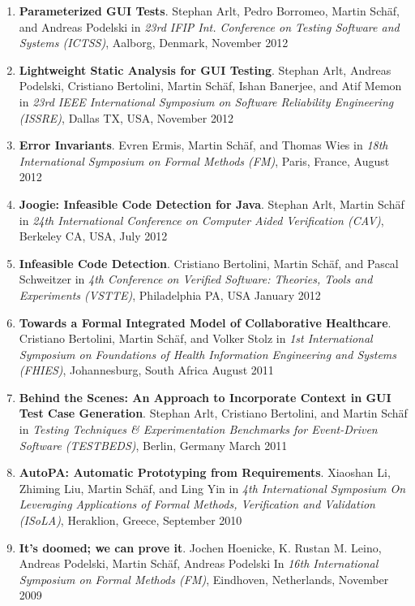 \begin{enumerate}
\item \textbf{Parameterized GUI Tests}. Stephan
Arlt, Pedro Borromeo,  Martin Sch\"af, and Andreas Podelski  in \emph{ 23rd
IFIP Int. Conference on Testing Software and Systems (ICTSS)}, Aalborg, Denmark,
November 2012

  
\item \textbf{Lightweight Static Analysis for GUI Testing}. Stephan
Arlt, Andreas Podelski, Cristiano Bertolini, Martin Sch\"af, Ishan Banerjee, and
Atif Memon in \emph{ 23rd IEEE International Symposium on Software Reliability
Engineering (ISSRE)}, Dallas TX, USA, November 2012


\item \textbf{Error Invariants}. Evren Ermis, Martin Sch\"af, and Thomas Wies in
\emph{18th International Symposium on Formal Methods (FM)}, Paris, France,
August 2012

\item \textbf{Joogie: Infeasible Code Detection for Java}. Stephan Arlt, Martin
Sch\"af in \emph{24th International Conference on Computer Aided Verification
(CAV)}, Berkeley CA, USA, July 2012

\item \textbf{Infeasible Code Detection}. Cristiano Bertolini, Martin
Sch\"af, and Pascal Schweitzer in \emph{4th Conference on Verified Software:
Theories, Tools and Experiments (VSTTE)}, Philadelphia PA, USA January 2012

\item \textbf{Towards a Formal Integrated Model of Collaborative Healthcare}.
Cristiano Bertolini, Martin Sch\"af, and Volker Stolz  in \emph{1st International Symposium on 
Foundations of Health Information Engineering and Systems (FHIES)}, Johannesburg, South Africa
August 2011

\item \textbf{Behind the Scenes: An Approach to Incorporate Context in GUI Test
Case Generation}. Stephan Arlt, Cristiano Bertolini, and Martin Sch\"af  in \emph{Testing Techniques \& Experimentation Benchmarks
for Event-Driven Software (TESTBEDS)}, Berlin, Germany
March 2011

\item \textbf{AutoPA: Automatic Prototyping from Requirements}. Xiaoshan Li,
Zhiming Liu, Martin Sch\"af, and Ling Yin in \emph{4th International Symposium On Leveraging Applications of Formal Methods, Verification and Validation (ISoLA)}, Heraklion, Greece,
September 2010

\item \textbf{It's doomed; we can prove it}. Jochen Hoenicke, K. Rustan M.
Leino, Andreas Podelski, Martin Sch\"af, Andreas Podelski In
\emph{16th International Symposium on Formal Methods (FM)}, Eindhoven, Netherlands,
November 2009
  
\setcounter{saveenum}{\value{enumi}}
\end{enumerate}



